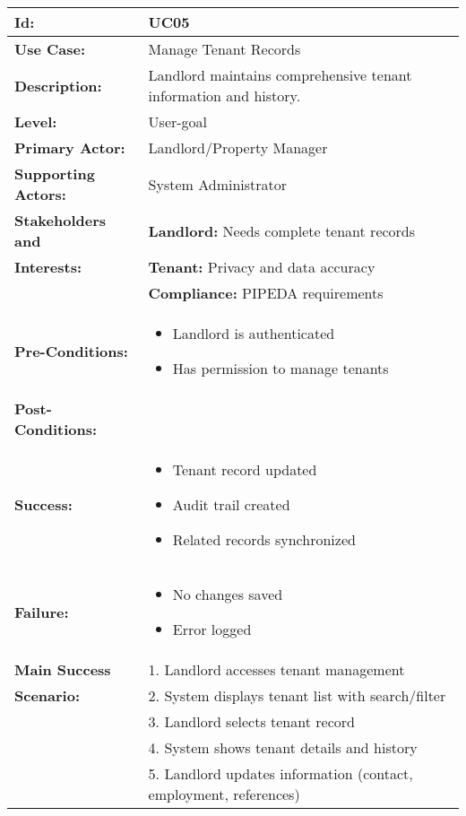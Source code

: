 \documentclass[12pt]{article}
\begin{document}
\begin{longtable}{|p{3cm}|p{11cm}|}
\hline
\textbf{Id:} & UC05 \\
\hline
\textbf{Use Case:} & Manage Tenant Records \\
\hline
\textbf{Description:} & Landlord maintains comprehensive tenant information and history. \\
\hline
\textbf{Level:} & User-goal \\
\hline
\textbf{Primary Actor:} & Landlord/Property Manager \\
\hline
\textbf{Supporting Actors:} & System Administrator \\
\hline
\textbf{Stakeholders and} & \textbf{Landlord:} Needs complete tenant records \\
\textbf{Interests:} & \textbf{Tenant:} Privacy and data accuracy \\
& \textbf{Compliance:} PIPEDA requirements \\
\hline
\textbf{Pre-Conditions:} & 
\begin{itemize}
    \item Landlord is authenticated
    \item Has permission to manage tenants
\end{itemize} \\
\hline
\textbf{Post-Conditions:} & \\
\textbf{Success:} & 
\begin{itemize}
    \item Tenant record updated
    \item Audit trail created
    \item Related records synchronized
\end{itemize} \\
\textbf{Failure:} & 
\begin{itemize}
    \item No changes saved
    \item Error logged
\end{itemize} \\
\hline
\textbf{Main Success} & 1. Landlord accesses tenant management \\
\textbf{Scenario:} & 2. System displays tenant list with search/filter \\
& 3. Landlord selects tenant record \\
& 4. System shows tenant details and history \\
& 5. Landlord updates information (contact, employment, references) \\

\end{longtable}
\end{document}
